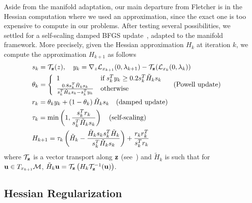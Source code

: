 Aside from the manifold adaptation, our main departure from Fletcher is in the Hessian computation where we used an approximation, since the exact one is too expensive to compute in our problems.
After testing several possibilities, we settled for a self-scaling damped BFGS update~\cite{nocedal:mp:1993,nocedal:book:2006}, adapted to the manifold framework.
More precisely, given the Hessian approximation $H_k$ at iteration $k$, we compute the approximation $H_{k+1}$ as follows
\begin{align}
  &s_k = \mathcal{T}_{\bf z}(z), \quad y_k = \nabla_z \mathcal{L}_{x_{k+1}}(0,\lambda_{k+1}) - \mathcal{T}_{\bf z}(\mathcal{L}_{x_{k}}(0,\lambda_{k})) \nonumber\\
  &\theta_k = \left\{\begin{array}{ll}
    1 & \mbox{if} \; s_k^T y_k \geq 0.2 s_k^T \tilde{H}_k s_k \\
    \frac{0.8 s_k^T \tilde{H}_k s_k}{s_k^T \tilde{H}_k s_k - s_k^T y_k} & \mbox{otherwise}
  \end{array}\right. \quad \mbox{(Powell update)}\nonumber\\
  &r_k = \theta_k y_k + \left(1-\theta_k\right) \tilde{H}_k s_k \quad \mbox{(damped update)} \nonumber\\
  &\tau_k = \min\left(1, \frac{s_k^T r_k}{s_k^T \tilde{H}_k s_k} \right) \quad \mbox{(self-scaling)} \nonumber\\
  &H_{k+1} = \tau_k \left(\tilde{H}_k-\frac{\tilde{H}_k s_k s_k^T \tilde{H}_k}{s_k^T \tilde{H}_k s_k} \right) + \frac{r_k r_k^T}{s_k^T r_k} \nonumber%
\end{align}
where $\mathcal{T}_{\bf z}$ is a vector transport along ${\bf z}$ (see~\cite{absil:book:2008}) and $\tilde{H}_k$ is such that for ${\bf u} \in T_{x_{k+1}} \mathcal{M}$, $\tilde{H}_k {\bf u} = \mathcal{T}_{\bf z}\left(H_k \mathcal{T}_{\bf z}^{-1}({\bf u}) \right)$.

\subsection{Hessian Regularization}
\label{sub:hessian_regularization}

